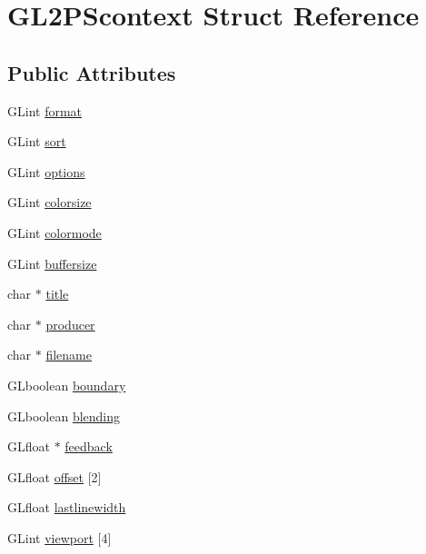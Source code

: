 \hypertarget{struct_g_l2_p_scontext}{}\section{G\+L2\+P\+Scontext Struct Reference}
\label{struct_g_l2_p_scontext}
\subsection*{Public Attributes}
\begin{DoxyCompactItemize}
\item 
G\+Lint \hyperlink{struct_g_l2_p_scontext_a32c2cf3724d6bd19e23e2eee3e5df327}{format}
\item 
G\+Lint \hyperlink{struct_g_l2_p_scontext_a138a8c9e7e3692853b32be020346ef14}{sort}
\item 
G\+Lint \hyperlink{struct_g_l2_p_scontext_a85ffa3220ca660484dbd86e038b5b137}{options}
\item 
G\+Lint \hyperlink{struct_g_l2_p_scontext_ac5aa29ee9da9691787e38a7f4b7590de}{colorsize}
\item 
G\+Lint \hyperlink{struct_g_l2_p_scontext_a6bf2136e8b60459d996ee187c9268ddb}{colormode}
\item 
G\+Lint \hyperlink{struct_g_l2_p_scontext_add11b55efa212e2ef663eead00d191ee}{buffersize}
\item 
char $\ast$ \hyperlink{struct_g_l2_p_scontext_a7134771c0c60d5295f47567c44b0dee0}{title}
\item 
char $\ast$ \hyperlink{struct_g_l2_p_scontext_a2b24e5b12218fe845a0cd7aedc1abb20}{producer}
\item 
char $\ast$ \hyperlink{struct_g_l2_p_scontext_abf0ec2a3907593fd0be11b6c2c297432}{filename}
\item 
G\+Lboolean \hyperlink{struct_g_l2_p_scontext_a2c693b811a62921dd6bb517cc134fece}{boundary}
\item 
G\+Lboolean \hyperlink{struct_g_l2_p_scontext_a660b3542fd585b70fa2080739e7422ca}{blending}
\item 
G\+Lfloat $\ast$ \hyperlink{struct_g_l2_p_scontext_a952fc0e5828ef69244b6257b80ae40b3}{feedback}
\item 
G\+Lfloat \hyperlink{struct_g_l2_p_scontext_af07d943c1933978abc1b3158deb7bdee}{offset} \mbox{[}2\mbox{]}
\item 
G\+Lfloat \hyperlink{struct_g_l2_p_scontext_aeacbba2cabb4cbb2dbeecd6b8eb2ae6b}{lastlinewidth}
\item 
G\+Lint \hyperlink{struct_g_l2_p_scontext_a39ea8db5482d4ea55283dea4334916cc}{viewport} \mbox{[}4\mbox{]}

\end{DoxyCompactItemize}
